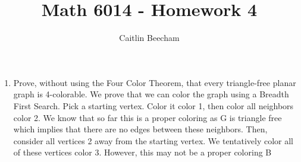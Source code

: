 \documentclass[10pt]{article}
\begin{document}
 
 
 
\title{Math 6014 - Homework 4}%
\author{Caitlin Beecham\\ %
} %
 
\maketitle

\begin{enumerate}
\item Prove, without using the Four Color Theorem, that every triangle-free planar graph is 4-colorable.
\newline
We prove that we can color the graph using a Breadth First Search.  Pick a starting vertex.  Color it color 1, then color all neighbors color 2.  We know that so far this is a proper coloring as G is triangle free which implies that there are no edges between these neighbors.  Then, consider all vertices 2 away from the starting vertex.  We tentatively color all of these vertices color 3.  However, this may not be a proper coloring  B
\end{enumerate}
\end{document}
